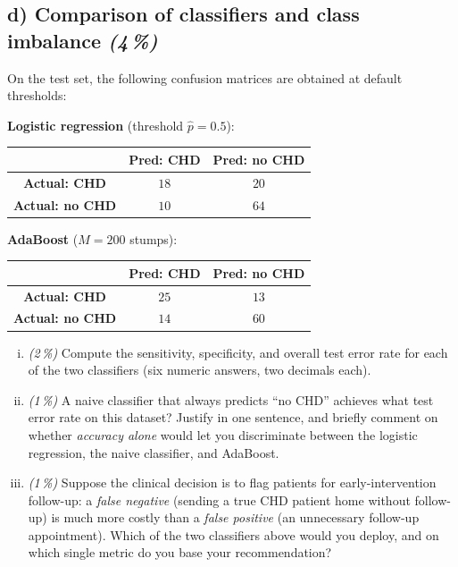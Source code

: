 \documentclass[11pt,a4paper]{article}
\newcommand{\subpoints}[1]{\textit{(#1\,\%)}}
\begin{document}
\subsection*{d) Comparison of classifiers and class imbalance \subpoints{4}}

On the test set, the following confusion matrices are obtained at default thresholds:

\begin{center}\small
\textbf{Logistic regression} (threshold $\hat p = 0.5$):\\[0.3em]
\begin{tabular}{c|cc}
 & \textbf{Pred: CHD} & \textbf{Pred: no CHD} \\\hline
\textbf{Actual: CHD}    & $18$ & $20$ \\
\textbf{Actual: no CHD} & $10$ & $64$ \\
\end{tabular}
\quad
\textbf{AdaBoost} ($M = 200$ stumps):\\[0.3em]
\begin{tabular}{c|cc}
 & \textbf{Pred: CHD} & \textbf{Pred: no CHD} \\\hline
\textbf{Actual: CHD}    & $25$ & $13$ \\
\textbf{Actual: no CHD} & $14$ & $60$ \\
\end{tabular}
\end{center}

\begin{enumerate}[(i)]
  \item \subpoints{2} Compute the sensitivity, specificity, and overall test error rate for each of the two classifiers (six numeric answers, two decimals each).

  \item \subpoints{1} A naive classifier that always predicts ``no CHD'' achieves what test error rate on this dataset? Justify in one sentence, and briefly comment on whether \emph{accuracy alone} would let you discriminate between the logistic regression, the naive classifier, and AdaBoost.

  \item \subpoints{1} Suppose the clinical decision is to flag patients for early-intervention follow-up: a \emph{false negative} (sending a true CHD patient home without follow-up) is much more costly than a \emph{false positive} (an unnecessary follow-up appointment). Which of the two classifiers above would you deploy, and on which single metric do you base your recommendation?
\end{enumerate}
\end{document}
